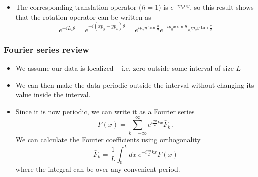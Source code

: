 \documentclass{beamer}
\begin{document}
\begin{frame}
\begin{itemize}
\begin{equation}
\begin{array}{c}
x +  \alpha y\\
y \\
\end{array}
\right )
\end{equation}
corresponds to a translation of the x coordinate proportional to $y$,
i.e. a shear.
\item
The corresponding translation operator ($\hbar = 1$) is $e^{-i p_x \alpha y}$,
so this result shows that the rotation operator can be written as
\begin{equation}
e^{-i L_z \theta} = e^{-i (x p_y- y p_x)\theta}
=
e^{i p_x y \tan\frac{\theta}{2}}
e^{-i p_y x \sin\theta}
e^{i p_x y \tan\frac{\theta}{2}}
\end{equation}
\end{itemize}
\end{frame}

\begin{frame}
\frametitle{Fourier series review}
\begin{itemize}
\item
We assume our data is localized -- i.e. zero outside some interval of size $L$
\item
We can then make the data periodic outside the interval without changing
its value inside the interval.
\item
Since it is now periodic, we can write it as a Fourier series
\begin{equation}
F(x) = \sum_{k = -\infty}^\infty e^{i \frac{2\pi}{L} k x} \bar F_k \,.
\end{equation}
We can calculate the Fourier coefficients using orthogonality
\begin{equation}
\bar F_k = \frac{1}{L} \int_0^L dx ~ e^{-i \frac{2\pi}{L} k x} F(x)
\end{equation}
where the integral can be over any convenient period.

\end{itemize}
\end{frame}
\end{document}
